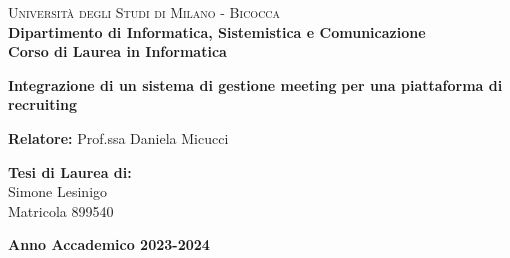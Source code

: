 
\begin{titlepage}
    
    \noindent
    \begin{minipage}[t]{0.19\textwidth}
    \end{minipage}
    \hspace{2mm}
    \begin{minipage}[t]{0.95\textwidth}
    {
            {\textsc{Università degli Studi di Milano - Bicocca}} \\
            \textbf{Dipartimento di Informatica, Sistemistica e Comunicazione} \\
            \textbf{Corso di Laurea in Informatica} \\
            \par
    }
    \end{minipage}
    
\vspace{40mm}
    
\begin{center}
        {\Large{
                \textbf{Integrazione di un sistema di gestione meeting}
                \textbf{per una piattaforma di recruiting}
                \par
        }}

    \end{center}
    
    \vspace{50mm}

    \noindent
    {\large \textbf{Relatore:} Prof.ssa Daniela Micucci} \\
    
    \vspace{15mm}

    \begin{flushright}
        {\large \textbf{Tesi di Laurea di:}} \\
        \large{Simone Lesinigo} \\
        \large{Matricola 899540} 
    \end{flushright}
    
    \vspace{20mm}
    \begin{center}
        {\large{\bf Anno Accademico 2023-2024}}
    \end{center}

    
\end{titlepage}

